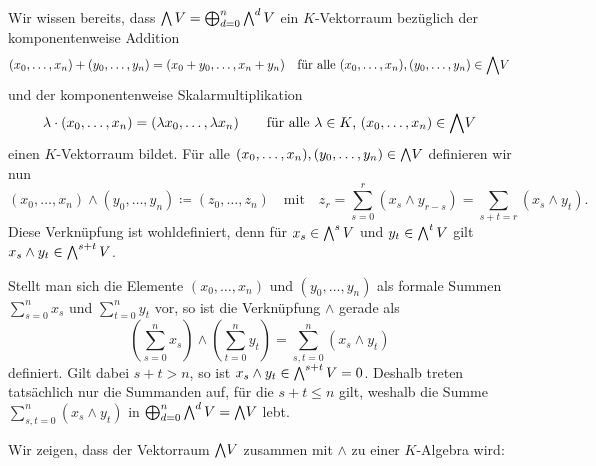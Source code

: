 Wir wissen bereits, dass $\bigwedge V = \bigoplus_{d=0}^n \bigwedge^{d} V$ ein $K$-Vektorraum bezüglich der komponentenweise Addition
\[
    (x_0, \dotsc, x_n) + (y_0, \dotsc, y_n) 
  = (x_0 + y_0, \dotsc, x_n + y_n)
  \quad
  \text{für alle $(x_0, \dotsc, x_n), (y_0, \dotsc, y_n) \in \bigwedge\!V$}
\]
und der komponentenweise Skalarmultiplikation
\[
    \lambda \cdot (x_0, \dotsc, x_n)
  = (\lambda x_0, \dotsc, \lambda x_n)
  \qquad
  \text{für alle $\lambda \in K$, $(x_0, \dotsc, x_n) \in \bigwedge\!V$}
\]
einen $K$-Vektorraum bildet.
Für alle $(x_0, \dotsc, x_n), (y_0, \dotsc, y_n) \in \bigwedge\!V$ definieren wir nun
\[
            (x_0, \dotsc, x_n) \wedge (y_0, \dotsc, y_n)
  \coloneqq (z_0, \dotsc, z_n)
  \quad\text{mit}\quad
            z_r = \sum_{s=0}^r (x_s \wedge y_{r-s})
                = \sum_{s + t = r} (x_s \wedge y_t).
\]
Diese Verknüpfung ist wohldefiniert, denn für $x_s \in \bigwedge^{s} V$ und $y_t \in \bigwedge^{t} V$ gilt $x_s \wedge y_t \in \bigwedge^{s+t} V$.

\begin{remark}
  Stellt man sich die Elemente $(x_0, \dotsc, x_n)$ und $(y_0, \dotsc, y_n)$ als formale Summen $\sum_{s=0}^n x_s$ und $\sum_{t=0}^n y_t$ vor, so ist die Verknüpfung $\wedge$ gerade als
  \[
      \left( \sum_{s=0}^n x_s \right) \wedge \left( \sum_{t=0}^n y_t \right)
    = \sum_{s,t = 0}^n (x_s \wedge y_t)
  \]
  definiert.
  Gilt dabei $s + t > n$, so ist $x_s \wedge y_t \in \bigwedge^{s+t} V = 0$.
  Deshalb treten tatsächlich nur die Summanden auf, für die $s + t \leq n$ gilt, weshalb die Summe $\sum_{s,t = 0}^n (x_s \wedge y_t)$ in $\bigoplus_{d=0}^n \bigwedge^{d} V = \bigwedge\!V$ lebt.
\end{remark}

Wir zeigen, dass der Vektorraum $\bigwedge\!V$ zusammen mit $\wedge$ zu einer $K$-Algebra wird:

